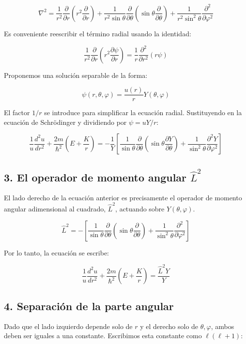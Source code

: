\documentclass[a4paper]{article}
\begin{document}
\[
\nabla^2 = \frac{1}{r^2}\frac{\partial}{\partial r}\left(r^2\frac{\partial}{\partial r}\right) + \frac{1}{r^2\sin\theta}\frac{\partial}{\partial\theta}\left(\sin\theta\frac{\partial}{\partial\theta}\right) + \frac{1}{r^2\sin^2\theta}\frac{\partial^2}{\partial\varphi^2}
\]

Es conveniente reescribir el término radial usando la identidad:

\[
\frac{1}{r^2}\frac{\partial}{\partial r}\left(r^2\frac{\partial\psi}{\partial r}\right) = \frac{1}{r}\frac{\partial^2}{\partial r^2}(r\psi)
\]

Proponemos una solución separable de la forma:

\[
\psi(r, \theta, \varphi) = \frac{u(r)}{r} Y(\theta, \varphi)
\]

El factor $1/r$ se introduce para simplificar la ecuación radial. Sustituyendo en la ecuación de Schrödinger y dividiendo por $\psi = uY/r$:

\[
\frac{1}{u}\frac{d^2u}{dr^2} + \frac{2m}{\hbar^2}\left(E + \frac{K}{r}\right) = -\frac{1}{Y}\left[\frac{1}{\sin\theta}\frac{\partial}{\partial\theta}\left(\sin\theta\frac{\partial Y}{\partial\theta}\right) + \frac{1}{\sin^2\theta}\frac{\partial^2 Y}{\partial\varphi^2}\right]
\]

\subsection[3. El operador de momento angular L2]{3. El operador de momento angular $\hat{L}^2$}

El lado derecho de la ecuación anterior es precisamente el operador de momento angular adimensional al cuadrado, $\hat{L}^2$, actuando sobre $Y(\theta, \varphi)$.

\[
\hat{L}^2 = -\left[\frac{1}{\sin\theta}\frac{\partial}{\partial\theta}\left(\sin\theta\frac{\partial}{\partial\theta}\right) + \frac{1}{\sin^2\theta}\frac{\partial^2}{\partial\varphi^2}\right]
\]

Por lo tanto, la ecuación se escribe:

\[
\frac{1}{u}\frac{d^2u}{dr^2} + \frac{2m}{\hbar^2}\left(E + \frac{K}{r}\right) = \frac{\hat{L}^2 Y}{Y}
\]

\subsection{4. Separación de la parte angular}

Dado que el lado izquierdo depende solo de $r$ y el derecho solo de $\theta, \varphi$, ambos deben ser iguales a una constante. Escribimos esta constante como $\ell(\ell+1)$:
\end{document}
